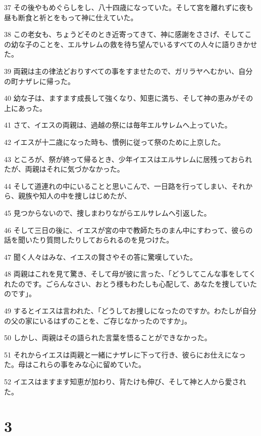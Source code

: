 \par 37 その後やもめぐらしをし、八十四歳になっていた。そして宮を離れずに夜も昼も断食と祈とをもって神に仕えていた。
\par 38 この老女も、ちょうどそのとき近寄ってきて、神に感謝をささげ、そしてこの幼な子のことを、エルサレムの救を待ち望んでいるすべての人々に語りきかせた。
\par 39 両親は主の律法どおりすべての事をすませたので、ガリラヤへむかい、自分の町ナザレに帰った。
\par 40 幼な子は、ますます成長して強くなり、知恵に満ち、そして神の恵みがその上にあった。
\par 41 さて、イエスの両親は、過越の祭には毎年エルサレムへ上っていた。
\par 42 イエスが十二歳になった時も、慣例に従って祭のために上京した。
\par 43 ところが、祭が終って帰るとき、少年イエスはエルサレムに居残っておられたが、両親はそれに気づかなかった。
\par 44 そして道連れの中にいることと思いこんで、一日路を行ってしまい、それから、親族や知人の中を捜しはじめたが、
\par 45 見つからないので、捜しまわりながらエルサレムへ引返した。
\par 46 そして三日の後に、イエスが宮の中で教師たちのまん中にすわって、彼らの話を聞いたり質問したりしておられるのを見つけた。
\par 47 聞く人々はみな、イエスの賢さやその答に驚嘆していた。
\par 48 両親はこれを見て驚き、そして母が彼に言った、「どうしてこんな事をしてくれたのです。ごらんなさい、おとう様もわたしも心配して、あなたを捜していたのです」。
\par 49 するとイエスは言われた、「どうしてお捜しになったのですか。わたしが自分の父の家にいるはずのことを、ご存じなかったのですか」。
\par 50 しかし、両親はその語られた言葉を悟ることができなかった。
\par 51 それからイエスは両親と一緒にナザレに下って行き、彼らにお仕えになった。母はこれらの事をみな心に留めていた。
\par 52 イエスはますます知恵が加わり、背たけも伸び、そして神と人から愛された。

\chapter{3}

